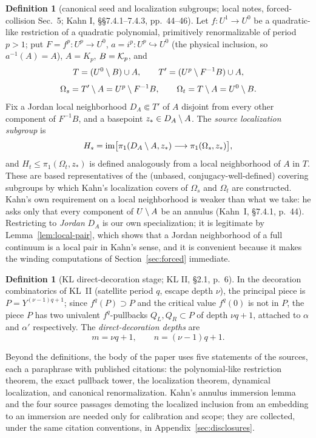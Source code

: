 \documentclass[11pt,reqno]{amsart}
\theoremstyle{definition}
\newtheorem{definition}[theorem]{Definition}
\theoremstyle{remark}
\begin{document}
\begin{definition}[canonical seed and localization subgroups; local notes, forced-collision Sec.~5; Kahn I, \S\S7.4.1--7.4.3, pp.~44--46]\label{def:hs-ht}
Let \(f\colon U^1\to U^0\) be a quadratic-like restriction of a
quadratic polynomial, primitively renormalizable of period \(p>1\); put
\(F=f^p\colon U^p\to U^0\), \(a=i^p\colon U^p\hookrightarrow U^0\)
(the physical inclusion, so \(a^{-1}(A)=A\)), \(A=K_p\),
\(B=\mathcal{K}_p\), and
\[
 T=(U^0\setminus B)\cup A,\qquad T'=(U^p\setminus F^{-1}B)\cup A,
\]
\[
 \Omega_s=T'\setminus A=U^p\setminus F^{-1}B,\qquad
 \Omega_t=T\setminus A=U^0\setminus B.
\]
Fix a Jordan local neighborhood \(D_A\Subset T'\) of \(A\) disjoint
from every other component of \(F^{-1}B\), and a basepoint
\(z_*\in D_A\setminus A\).  The \emph{source localization subgroup} is
\[
 H_s=\operatorname{im}\bigl[\pi_1(D_A\setminus A,z_*)\longrightarrow
 \pi_1(\Omega_s,z_*)\bigr],
\]
and \(H_t\le\pi_1(\Omega_t,z_*)\) is defined analogously from a local
neighborhood of \(A\) in \(T\).  These are based representatives of the
(unbased, conjugacy-well-defined) covering subgroups by which Kahn's
localization covers of \(\Omega_s\) and \(\Omega_t\) are constructed.
Kahn's own requirement on a local neighborhood is weaker than what we
take: he asks only that every component of \(U\setminus A\) be an annulus
(Kahn~I, \S7.4.1, p.~44).  Restricting to \emph{Jordan} \(D_A\) is our
own specialization; it is legitimate by Lemma~\ref{lem:local-pair},
which shows that a Jordan neighborhood of a full continuum is a local
pair in Kahn's sense, and it is convenient because it makes the
winding computations of Section~\ref{sec:forced} immediate.
\end{definition}

\begin{definition}[KL direct-decoration stage; KL II, \S2.1, p.~6]\label{def:kl-decoration}
In the decoration combinatorics of KL~II (satellite period \(q\),
escape depth \(\nu\)), the principal piece is \(P=Y^{(\nu-1)q+1}\);
since \(f^q(P)\supset P\) and the critical value \(f^q(0)\) is not in
\(P\), the piece \(P\) has two univalent \(f^q\)-pullbacks
\(Q_L,Q_R\subset P\) of depth \(\nu q+1\), attached to \(\alpha\) and
\(\alpha'\) respectively.  The \emph{direct-decoration depths} are
\[
 m=\nu q+1,\qquad n=(\nu-1)q+1 .
\]
\end{definition}

Beyond the definitions, the body of the paper uses five statements of
the sources, each a paraphrase with published citations: the
polynomial-like restriction theorem, the exact pullback tower, the
localization theorem, dynamical localization, and canonical
renormalization.  Kahn's annulus immersion lemma and the four source
passages demoting the localized inclusion from an embedding to an
immersion are needed only for calibration and scope; they are
collected, under the same citation conventions, in
Appendix~\ref{sec:disclosures}.
\end{document}
